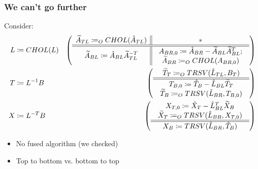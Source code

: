 \documentclass{beamer}
\begin{document}
\begin{frame}
  \frametitle{We can't go further}
  Consider:
  \begin{align*}
    L &\coloneqq CHOL(L) & \left( \begin{array}{c || c} \widetilde{A}_{TL} \coloneqq_O CHOL(\hat{A}_{TL}) & * \\ \hline \hline \widetilde{A}_{BL} \coloneqq \hat{A}_{BL}\widetilde{A}_{TL}^{-T} & \begin{array}{c}
                              A_{BR, 0} \coloneqq \hat{A}_{BR} - \widetilde{A}_{BL}\widetilde{A}_{BL}^T;\\
                              \widetilde{A}_{BR} \coloneqq_O CHOL(A_{BR, 0})
                            \end{array} \end{array} \right)\\
    T &\coloneqq L^{-1}B & \left( \begin{array}{c} \widetilde{T}_T \coloneqq_O TRSV(\hat{L}_{TL}, B_T) \\ \hline \hline \begin{array}{c}
                                T_{B, 0} \coloneqq \hat{T}_B - \hat{L}_{BL}\widetilde{T}_T\\
                                \widetilde{T}_B \coloneqq_O TRSV(\hat{L}_{BR}, T_{B, 0})
                              \end{array} \end{array} \right)\\
    X &\coloneqq L^{-T}B & \left( \begin{array}{c} 
                           \begin{array}{c}
                             X_{T, 0} \coloneqq \hat{X}_T - \hat{L}^T_{BL}\widetilde{X}_B\\
                             \widetilde{X}_T \coloneqq_O TRSV(\hat{L}_{BR}, X_{T, 0})
                           \end{array} \\ \hline \hline X_B \coloneqq TRSV(\hat{L}_{BR}, \hat{T}_B) \end{array} \right)\\
  \end{align*}

  \begin{itemize}
  \item No fused algorithm (we checked)
  \item Top to bottom vs. bottom to top
  \end{itemize}
\end{frame}
\end{document}
